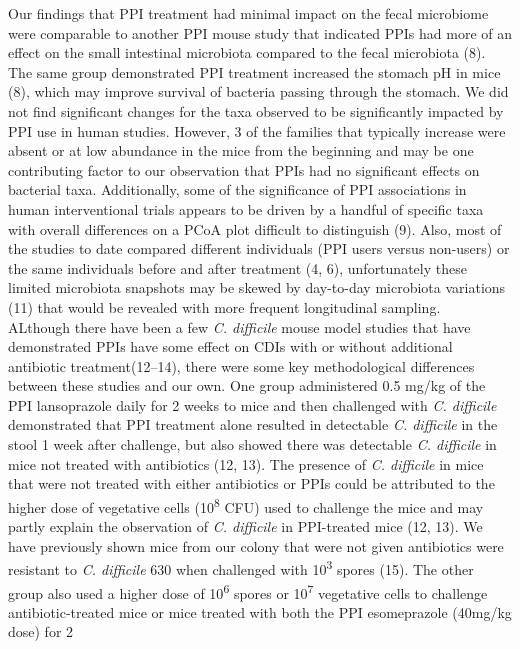\documentclass[11pt,]{article}
\begin{document}
Our findings that PPI treatment had minimal impact on the fecal
microbiome were comparable to another PPI mouse study that indicated
PPIs had more of an effect on the small intestinal microbiota compared
to the fecal microbiota (8). The same group demonstrated PPI treatment
increased the stomach pH in mice (8), which may improve survival of
bacteria passing through the stomach. We did not find significant
changes for the taxa observed to be significantly impacted by PPI use in
human studies. However, 3 of the families that typically increase were
absent or at low abundance in the mice from the beginning and may be one
contributing factor to our observation that PPIs had no significant
effects on bacterial taxa. Additionally, some of the significance of PPI
associations in human interventional trials appears to be driven by a
handful of specific taxa with overall differences on a PCoA plot
difficult to distinguish (9). Also, most of the studies to date compared
different individuals (PPI users versus non-users) or the same
individuals before and after treatment (4, 6), unfortunately these
limited microbiota snapshots may be skewed by day-to-day microbiota
variations (11) that would be revealed with more frequent longitudinal
sampling.\\
ALthough there have been a few \emph{C. difficile} mouse model studies
that have demonstrated PPIs have some effect on CDIs with or without
additional antibiotic treatment(12--14), there were some key
methodological differences between these studies and our own. One group
administered 0.5 mg/kg of the PPI lansoprazole daily for 2 weeks to mice
and then challenged with \emph{C. difficile} demonstrated that PPI
treatment alone resulted in detectable \emph{C. difficile} in the stool
1 week after challenge, but also showed there was detectable \emph{C.
difficile} in mice not treated with antibiotics (12, 13). The presence
of \emph{C. difficile} in mice that were not treated with either
antibiotics or PPIs could be attributed to the higher dose of vegetative
cells (10\textsuperscript{8} CFU) used to challenge the mice and may
partly explain the observation of \emph{C. difficile} in PPI-treated
mice (12, 13). We have previously shown mice from our colony that were
not given antibiotics were resistant to \emph{C. difficile} 630 when
challenged with 10\textsuperscript{3} spores (15). The other group also
used a higher dose of 10\textsuperscript{6} spores or
10\textsuperscript{7} vegetative cells to challenge antibiotic-treated
mice or mice treated with both the PPI esomeprazole (40mg/kg dose) for 2
\end{document}
